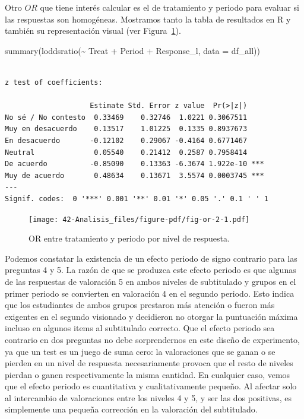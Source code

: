 \documentclass[
  12pt,
  a4paper,
  extrafontsizes,
  onecolumn,
  openright]{memoir}
\newenvironment{Shaded}{\begin{snugshade}}{\end{snugshade}}
\newcommand{\AttributeTok}[1]{\textcolor[rgb]{0.40,0.45,0.13}{#1}}
\newcommand{\FunctionTok}[1]{\textcolor[rgb]{0.28,0.35,0.67}{#1}}
\newcommand{\NormalTok}[1]{\textcolor[rgb]{0.00,0.23,0.31}{#1}}
\newcommand{\SpecialCharTok}[1]{\textcolor[rgb]{0.37,0.37,0.37}{#1}}
\begin{document}
Otro \(OR\) que tiene interés calcular es el de tratamiento y periodo
para evaluar si las respuestas son homogéneas. Mostramos tanto la tabla
de resultados en R y también su representación visual (ver
Figura~\ref{fig-or-2}).

\scriptsize

\begin{Shaded}
\begin{Highlighting}[]
\FunctionTok{summary}\NormalTok{(}\FunctionTok{loddsratio}\NormalTok{(}\SpecialCharTok{\textasciitilde{}}\NormalTok{ Treat }\SpecialCharTok{+}\NormalTok{ Period }\SpecialCharTok{+}\NormalTok{ Response\_l, }\AttributeTok{data =}\NormalTok{ df\_all))}
\end{Highlighting}
\end{Shaded}

\begin{verbatim}

z test of coefficients:

                    Estimate Std. Error z value  Pr(>|z|)    
No sé / No contesto  0.33469    0.32746  1.0221 0.3067511    
Muy en desacuerdo    0.13517    1.01225  0.1335 0.8937673    
En desacuerdo       -0.12102    0.29067 -0.4164 0.6771467    
Neutral              0.05540    0.21412  0.2587 0.7958414    
De acuerdo          -0.85090    0.13363 -6.3674 1.922e-10 ***
Muy de acuerdo       0.48634    0.13671  3.5574 0.0003745 ***
---
Signif. codes:  0 '***' 0.001 '**' 0.01 '*' 0.05 '.' 0.1 ' ' 1
\end{verbatim}

\normalsize

\begin{figure}[h]

{\centering \texttt{[image: 42-Analisis\_files/figure-pdf/fig-or-2-1.pdf]}

}

\caption{\label{fig-or-2}OR entre tratamiento y periodo por nivel de
respuesta.}

\end{figure}

Podemos constatar la existencia de un efecto periodo de signo contrario
para las preguntas 4 y 5. La razón de que se produzca este efecto
periodo es que algunas de las respuestas de valoración 5 en ambos
niveles de subtitulado y grupos en el primer periodo se convierten en
valoración 4 en el segundo periodo. Esto indica que los estudiantes de
ambos grupos prestaron más atención o fueron más exigentes en el segundo
visionado y decidieron no otorgar la puntuación máxima incluso en
algunos items al subtitulado correcto. Que el efecto periodo sea
contrario en dos preguntas no debe sorprendernos en este diseño de
experimento, ya que un test es un juego de suma cero: la valoraciones
que se ganan o se pierden en un nivel de respuesta necesariamente
provoca que el resto de niveles pierdan o ganen respectivamente la misma
cantidad. En cualquier caso, vemos que el efecto periodo es cuantitativa
y cualitativamente pequeño. Al afectar solo al intercambio de
valoraciones entre los niveles 4 y 5, y ser las dos positivas, es
simplemente una pequeña corrección en la valoración del subtitulado.
\end{document}
